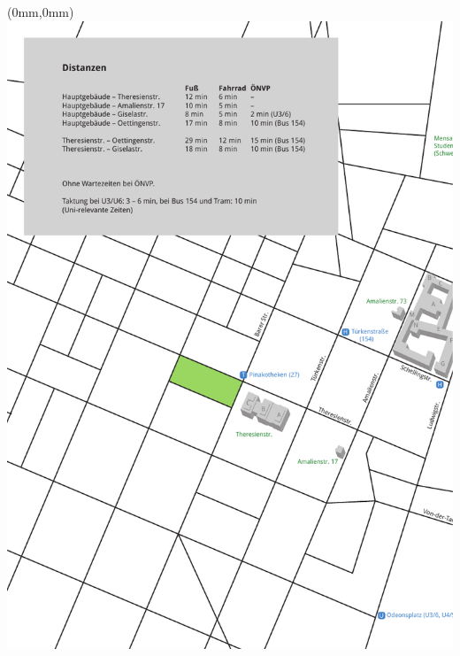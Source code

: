 \documentclass[twoside,a5paper,fontsize=9pt]{scrartcl}
\begin{document}
\thispagestyle{empty}
\begin{textblock*}{\paperwidth}(0mm,0mm)
   \noindent\includegraphics[width=\paperwidth,height=\paperheight]{lageplan_links}
\end{textblock*}
\mbox{}

\clearpage
\end{document}
